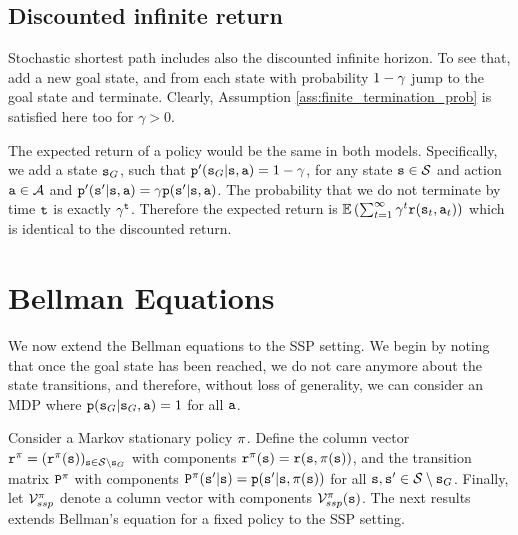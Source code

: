 \subsection{Discounted infinite return}

Stochastic shortest path includes also the discounted infinite
horizon. To see that, add a new goal state, and from each state with
probability $1-\gamma$ jump to the goal state and terminate. Clearly, Assumption \ref{ass:finite_termination_prob} is satisfied here too for $\gamma>0$. 

The expected return of a policy would be the same in both models.
Specifically, we add a state ${\tt s}_G$, such that
${\tt p}'({\tt s}_G|{\tt s},{\tt a})=1-\gamma$, for any state
${\tt s}\in\mathcal{S}$ and action ${\tt a}\in\mathcal{A}$ and
${\tt p}'({\tt s}'|{\tt s},{\tt a})=\gamma {\tt p}({\tt s}'|{\tt s},{\tt a})$. The
probability that we do not terminate by time ${\tt t}$ is exactly
$\gamma^{\tt t}$. Therefore the expected return is
$\mathbb{E}\left(\sum_{t=1}^\infty \gamma^t{\tt r}({\tt s}_t,{\tt a}_t)\right)$ which is
identical to the discounted return.





\section{Bellman Equations}\label{sec:ssp-bellman}

We now extend the Bellman equations to the SSP setting. We begin by noting that once the goal state has been reached, we do not care anymore about the state transitions, and therefore, without loss of generality, we can consider an MDP where ${\tt p}({\tt s}_G|{\tt s}_G,{\tt a}) = 1$ for all ${\tt a}$. 

Consider a Markov stationary policy $\pi$. Define the column vector ${{\tt r}^\pi } =
{({{\tt r}^\pi }({\tt s}))_{{\tt s} \in \mathcal{S} \setminus {\tt s}_G}}$ with components
${{\tt r}^\pi }({\tt s}) = {\tt r}({\tt s},\pi ({\tt s}))$, and the
transition matrix ${{\tt P}^\pi }$ with components ${{\tt P}^\pi
}({\tt s}'|{\tt s}) = {\tt p}({\tt s}'|{\tt s},\pi ({\tt s}))$ for all ${\tt s},{\tt s}' \in \mathcal{S} \setminus {\tt s}_G$. Finally,
let ${\mathcal{V}_{ssp}^\pi }$ denote a column vector with components
${\mathcal{V}_{ssp}^\pi }({\tt s})$. The next results extends Bellman's equation for a fixed policy to the SSP setting.



